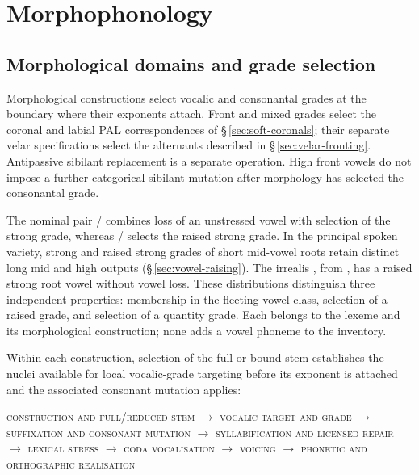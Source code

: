 \chapter{Morphophonology}\label{ch:morphophonology}

\section{Morphological domains and grade selection}\label{sec:morphophon}

Morphological constructions select vocalic and consonantal grades at the
boundary where their exponents attach. Front and mixed grades select the
coronal and labial PAL correspondences of §\,\ref{sec:soft-coronals};
their separate velar specifications select the alternants described in
§\,\ref{sec:velar-fronting}. Antipassive sibilant replacement is a separate
operation. High front vowels do not impose a further categorical
sibilant mutation after morphology has selected the consonantal grade.

The nominal pair / combines loss of an
unstressed vowel with selection of the strong grade, whereas
/ selects the raised strong grade. In the
principal spoken variety, strong and raised strong grades of short
mid-vowel roots retain distinct long mid and high outputs (§\,\ref{sec:vowel-raising}). The irrealis ,
from , has a raised strong root vowel without vowel loss.
These distributions distinguish three independent
properties: membership in the fleeting-vowel class, selection of a raised grade,
and selection of a quantity grade. Each belongs to the lexeme and its
morphological construction; none adds a vowel phoneme to the inventory.

Within each construction, selection of the full or bound stem establishes
the nuclei available for local vocalic-grade targeting before its exponent
is attached and the associated consonant mutation applies:

\begin{center}
\textsc{construction and full/reduced stem} $\rightarrow$
\textsc{vocalic target and grade}
$\rightarrow$ \textsc{suffixation and consonant mutation} $\rightarrow$
\textsc{syllabification and licensed repair} $\rightarrow$
\textsc{lexical stress} $\rightarrow$ \textsc{coda vocalisation}
$\rightarrow$ \textsc{voicing}
$\rightarrow$ \textsc{phonetic and orthographic realisation}
\end{center}

